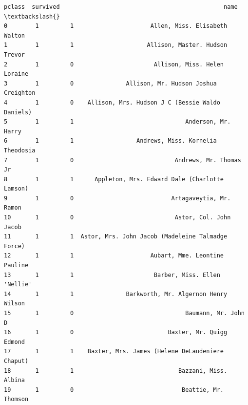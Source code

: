 \documentclass[11pt]{article}
\makeatletter
\newcommand{\boxspacing}{\kern\kvtcb@left@rule\kern\kvtcb@boxsep}
\newcommand{\prompt}[4]{
        {\ttfamily\llap{{\color{#2}[#3]:\hspace{3pt}#4}}\vspace{-\baselineskip}}
    }
\makeatother
\begin{document}
            \begin{tcolorbox}[breakable, size=fbox, boxrule=.5pt, pad at break*=1mm, opacityfill=0]
\prompt{Out}{outcolor}{3}{\boxspacing}
\begin{Verbatim}[commandchars=\\\{\}]
    pclass  survived                                               name  \textbackslash{}
0        1         1                      Allen, Miss. Elisabeth Walton
1        1         1                     Allison, Master. Hudson Trevor
2        1         0                       Allison, Miss. Helen Loraine
3        1         0               Allison, Mr. Hudson Joshua Creighton
4        1         0    Allison, Mrs. Hudson J C (Bessie Waldo Daniels)
5        1         1                                Anderson, Mr. Harry
6        1         1                  Andrews, Miss. Kornelia Theodosia
7        1         0                             Andrews, Mr. Thomas Jr
8        1         1      Appleton, Mrs. Edward Dale (Charlotte Lamson)
9        1         0                            Artagaveytia, Mr. Ramon
10       1         0                             Astor, Col. John Jacob
11       1         1  Astor, Mrs. John Jacob (Madeleine Talmadge Force)
12       1         1                      Aubart, Mme. Leontine Pauline
13       1         1                       Barber, Miss. Ellen 'Nellie'
14       1         1               Barkworth, Mr. Algernon Henry Wilson
15       1         0                                Baumann, Mr. John D
16       1         0                           Baxter, Mr. Quigg Edmond
17       1         1    Baxter, Mrs. James (Helene DeLaudeniere Chaput)
18       1         1                              Bazzani, Miss. Albina
19       1         0                               Beattie, Mr. Thomson


\end{Verbatim}
\end{tcolorbox}
\end{document}
